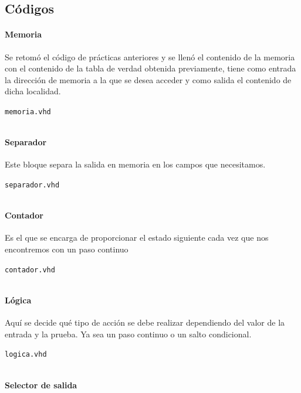 \documentclass[table]{scrartcl}
\newenvironment{code}{\captionsetup{type=listing}}{}
\begin{document}
\subsection{Códigos}\label{sec:codigos}

\paragraph{Memoria}

Se retomó el código de prácticas anteriores y se llenó el contenido de la
memoria con el contenido de la tabla de verdad obtenida previamente, tiene como
entrada la dirección de memoria a la que se desea acceder y como salida el
contenido de dicha localidad.
\begin{code}
  \caption{\texttt{memoria.vhd}}
  \inputminted{vhdl}{./memoria.vhd}
\end{code}

\paragraph{Separador}

Este bloque separa la salida en memoria en los campos que necesitamos.
\begin{code}
  \caption{\texttt{separador.vhd}}
  \inputminted{vhdl}{./separador.vhd}
\end{code}

\paragraph{Contador}

Es el que se encarga de proporcionar el estado siguiente cada vez que nos encontremos con un paso continuo
\begin{code}
  \caption{\texttt{contador.vhd}}
  \inputminted{vhdl}{./contador.vhd}
\end{code}

\paragraph{Lógica}

Aquí se decide qué tipo de acción se debe realizar dependiendo del valor de la
entrada y la prueba. Ya sea un paso continuo o un salto condicional.
\begin{code}
  \caption{\texttt{logica.vhd}}
  \inputminted{vhdl}{./logica.vhd}
\end{code}

\paragraph{Selector de salida}
\end{document}
